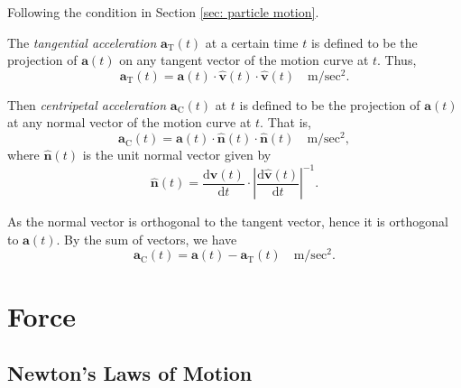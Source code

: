Following the condition in Section \ref{sec: particle motion}.

The \textit{tangential acceleration} $\mathbf a_\mathrm{T}(t)$ at a certain time $t$ is defined to be the projection of $\mathbf a(t)$ on any tangent vector of the motion curve at $t$. Thus,
\begin{equation}
	\label{eq: tangential acceleration}
	\mathbf a_\mathrm{T}(t) = \mathbf a(t) \cdot \mathbf{\hat v}(t) \cdot \mathbf{\hat v}(t) \quad \mathrm{m/sec^2}.
\end{equation}

Then \textit{centripetal acceleration} $\mathbf a_\mathrm{C}(t)$ at $t$ is defined to be the projection of $\mathbf a(t)$ at any normal vector of the motion curve at $t$. That is,
\begin{equation}
	\mathbf a_{\mathrm C}(t) = \mathbf a(t) \cdot \mathbf{\hat n}(t) \cdot \mathbf{\hat n}(t) \quad \mathrm{m / sec^2},
\end{equation}
where $\mathbf{\hat n}(t)$ is the unit normal vector given by
$$
\mathbf{\hat n}(t) = \frac{\mathrm d \mathbf{\hat v}(t)}{\mathrm d t} \cdot \left|\frac{\mathrm d \mathbf{\hat v}(t)}{\mathrm d t} \right|^{-1}.
$$

As the normal vector is orthogonal to the tangent vector, hence it is orthogonal to $\mathbf a(t)$. By the sum of vectors, we have
\begin{equation}
	\label{eq: centripetal acceleration}
	\mathbf a_{\mathrm C}(t) = \mathbf a(t) - \mathbf a_\mathrm{T}(t) \quad \mathrm{m / sec^2}.
\end{equation}











\chapter{Force}



\section{Newton's Laws of Motion}


